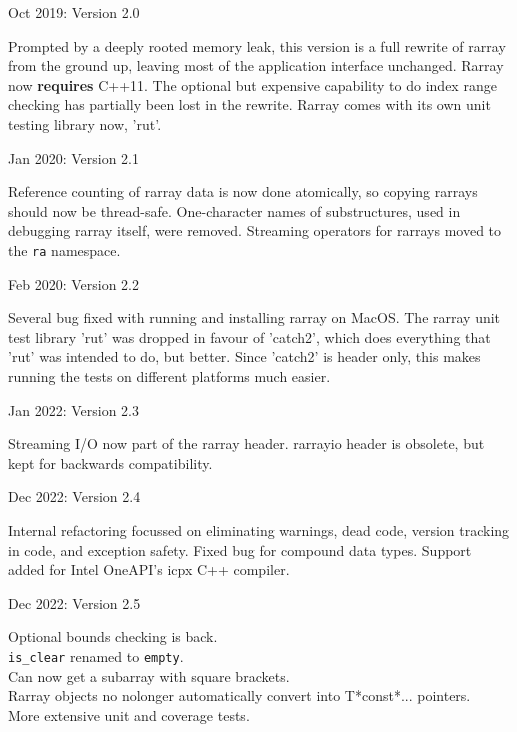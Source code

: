 \documentclass[11pt,twoside]{article}
\begin{document}
\noindent
Oct 2019: Version 2.0

Prompted by a deeply rooted memory leak, this version is a full
rewrite of rarray from the ground up, leaving most of the application
interface unchanged.  Rarray now \textbf{requires} C++11.
The optional but expensive capability to do index range checking has
partially been lost in the rewrite.  Rarray comes with its own unit testing
library now, 'rut'.

\noindent
Jan 2020: Version 2.1

Reference counting of rarray data is now done atomically, so copying
rarrays should now be thread-safe.  One-character names of
substructures, used in debugging rarray itself, were
removed. Streaming operators for rarrays moved to the \texttt{ra}
namespace.

\noindent
Feb 2020: Version 2.2

Several bug fixed with running and installing rarray on MacOS.  The
rarray unit test library 'rut' was dropped in favour of 'catch2',
which does everything that 'rut' was intended to do, but better. Since
'catch2' is header only, this makes running the tests on different
platforms much easier.

\noindent
Jan 2022: Version 2.3

Streaming I/O now part of the rarray header. rarrayio header is
obsolete, but kept for backwards compatibility. 

\noindent
Dec 2022: Version 2.4

Internal refactoring focussed on eliminating warnings, dead code,
version tracking in code, and exception safety.
Fixed bug for compound data types.
Support added for Intel OneAPI's icpx C++ compiler.

\noindent
Dec 2022: Version 2.5

Optional bounds checking is back.\\
\texttt{is\_clear} renamed to \texttt{empty}.\\
Can now get a subarray with square brackets.\\
Rarray objects no nolonger automatically convert into T*const*... pointers.\\
More extensive unit and coverage tests.
\end{document}
